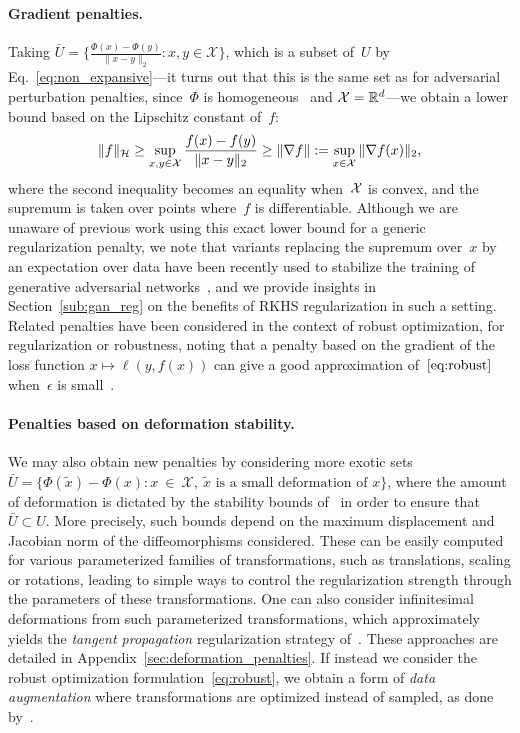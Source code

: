 \paragraph{Gradient penalties.}
Taking $\bar{U} \!= \! \{\frac{\Phi(x) - \Phi(y)}{\|x - y\|_2} : x, y \!\in\! \mathcal X\}$, which is a subset of~$U$
by Eq.~\eqref{eq:non_expansive}---it turns out that this is the same set as for adversarial perturbation penalties,
since~$\Phi$ is homogeneous~\citep{bietti2018group} and $\mathcal X =
{\mathbb R}^d$---we obtain a lower bound based on the Lipschitz constant of~$f$:
\begin{equation}
\|f\|_{\mathcal H} \geq \sup_{x, y \in \mathcal{X}} \frac{f(x) - f(y)}{\|x - y\|_2} \geq \|\nabla f\| := \sup_{x \in \mathcal X} \|\nabla f(x)\|_2, \label{eq:gradientpenalty}
\end{equation}
where the second inequality becomes an equality when~${\mathcal X}$ is convex,
and the supremum is taken over points where~$f$ is differentiable.
Although we are unaware of previous work using this exact lower bound for a generic regularization penalty,
we note that variants replacing the supremum over~$x$ by an expectation over data have been recently used
to stabilize the training of generative adversarial networks~\citep{gulrajani2017improved,roth2017stabilizing},
and we provide insights in Section~\ref{sub:gan_reg} on the benefits of RKHS regularization in such a setting.
Related penalties have been considered in the context of robust optimization,
for regularization or robustness,
noting that a penalty based on the gradient of the loss function $x \mapsto \ell(y, f(x))$ can give a good approximation of~$\eqref{eq:robust}$
when~$\epsilon$ is small~\citep{drucker1991double,lyu2015unified,roth2018adversarially,simon2018adversarial}.

\paragraph{Penalties based on deformation stability.}
We may also obtain new penalties by considering more exotic sets
$\bar{U} = \{\Phi(\tilde x) - \Phi(x) : x~\in~{\mathcal X},~ \tilde x \text{ is a small} \text{ deformation of }x\}$,
where the amount of deformation is dictated by the stability bounds of~\citet{bietti2018group} in order to ensure that $\bar{U} \subset U$.
More precisely, such bounds depend on the maximum displacement and Jacobian norm of
the diffeomorphisms considered. These can be easily computed for various parameterized families
of transformations, such as translations, scaling or rotations, leading to simple ways to control
the regularization strength through the parameters of these transformations.
One can also consider infinitesimal deformations from such parameterized transformations,
which approximately yields the \emph{tangent propagation} regularization
strategy of~\citet{simard1998transformation}.
These approaches are detailed in Appendix~\ref{sec:deformation_penalties}.
If instead we consider the robust optimization formulation~\eqref{eq:robust}, we obtain a form
of \emph{data augmentation} where transformations are optimized instead of sampled, as done by~\citep{engstrom2017rotation}.


